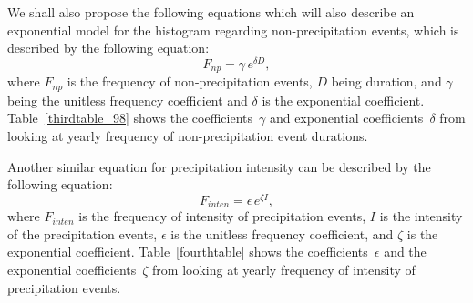 \documentclass[11pt]{report}
\begin{document}
We shall also propose the following equations which will also describe an exponential model for the histogram regarding non-precipitation events, which is described by the following equation: 
\begin{equation}\label{expod_np}
	F_{np} = \gamma \,e^{\delta D},
\end{equation}
where $F_{np}$ is the frequency of non-precipitation events, $D$ being duration, and $\gamma $ being the unitless frequency coefficient and $\delta $ is the exponential coefficient. Table~\ref{thirdtable_98} shows the coefficients~$\gamma$ and exponential coefficients~$\delta$ from looking at yearly frequency of non-precipitation event durations. 

Another similar equation for precipitation intensity can be described by the following equation: 
\begin{equation}\label{expod_inten}
	F_{inten} = \epsilon \,e^{\zeta I},
\end{equation}
where $F_{inten}$ is the frequency of intensity of precipitation events, $I$ is the intensity of the precipitation events, $\epsilon$ is the unitless frequency coefficient, and $\zeta$ is the exponential coefficient. Table~\ref{fourthtable} shows the coefficients~$\epsilon$ and the exponential coefficients~$\zeta$ from looking at yearly frequency of intensity of precipitation events.  
\end{document}
